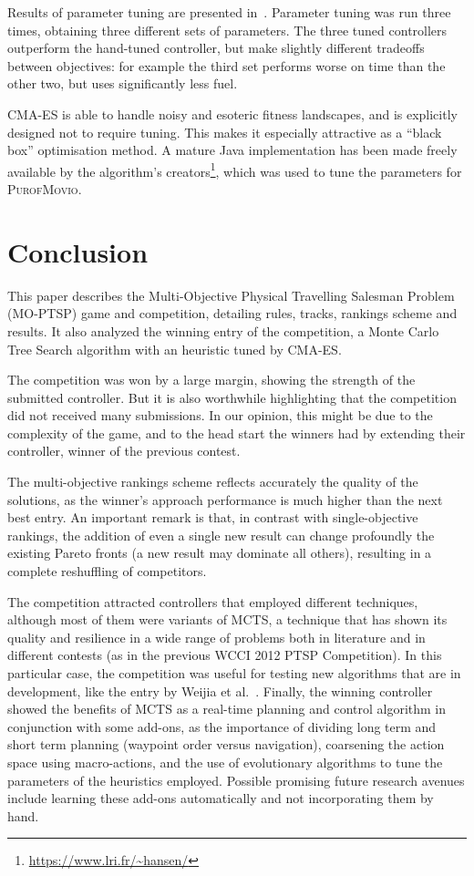 \documentclass[conference]{IEEEtran}
\begin{document}
Results of parameter tuning are presented in~\cite{Powley2013_moptsp}.
Parameter tuning was run three times, obtaining three different sets of parameters.
The three tuned controllers outperform the hand-tuned controller,
but make slightly different tradeoffs between objectives:
for example the third set performs worse on time than the other two, but uses significantly less fuel.

CMA-ES is able to handle noisy and esoteric fitness landscapes, and is explicitly designed not to require tuning.
This makes it especially attractive as a ``black box'' optimisation method.
A mature Java implementation has been made freely available by the algorithm's creators\footnote{\url{https://www.lri.fr/~hansen/}},
which was used to tune the parameters for \textsc{PurofMovio}.

\section{Conclusion} \label{sec:conc}

This paper describes the Multi-Objective Physical Travelling Salesman Problem (MO-PTSP) game and competition, detailing rules, tracks, rankings scheme and results. It also analyzed the winning entry of the competition, a Monte Carlo Tree Search algorithm with an heuristic tuned by CMA-ES.  

The competition was won by a large margin, showing the strength of the submitted controller. But it is also worthwhile highlighting that the competition did not received many submissions. In our opinion, this might be due to the complexity of the game, and to the head start the winners had by extending their controller, winner of the previous contest.

The multi-objective rankings scheme reflects accurately the quality of the solutions, as the winner's approach performance is much higher than the next best entry. An important remark is that, in contrast with single-objective rankings, the addition of even a single new result can change profoundly the existing Pareto fronts (a new result may dominate all others), resulting in a complete reshuffling of competitors.

The competition attracted controllers that employed different techniques, although most of them were variants of MCTS, a technique that has shown its quality and resilience in a wide range of problems both in literature and in different contests (as in the previous WCCI 2012 PTSP Competition). In this particular case, the competition was useful for testing new algorithms that are in development, like the entry by Weijia et al.~\cite{Wang13}. Finally, the winning controller showed the benefits of MCTS as a real-time planning and control algorithm in conjunction with some add-ons, as the importance of dividing long term and short term planning (waypoint order versus navigation), coarsening the action space using macro-actions, and the use of evolutionary algorithms to tune the parameters of the heuristics employed. Possible promising future research avenues include learning these add-ons automatically and not incorporating them by hand. 




\end{document}
